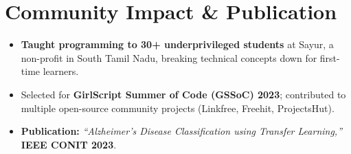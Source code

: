 \documentclass[letterpaper,10pt]{article}
\begin{document}
\section{Community Impact \& Publication}
\begin{itemize}[leftmargin=0.18in, itemsep=0pt, topsep=1pt]
  \item\small \textbf{Taught programming to 30+ underprivileged students} at Sayur, a non-profit in South Tamil Nadu, breaking technical concepts down for first-time learners.
  \item\small Selected for \textbf{GirlScript Summer of Code (GSSoC) 2023}; contributed to multiple open-source community projects (Linkfree, Freehit, ProjectsHut).
  \item\small \textbf{Publication:} \textit{``Alzheimer's Disease Classification using Transfer Learning,''} \textbf{IEEE CONIT 2023}.
\end{itemize}
\vspace{-6pt}
\end{document}
